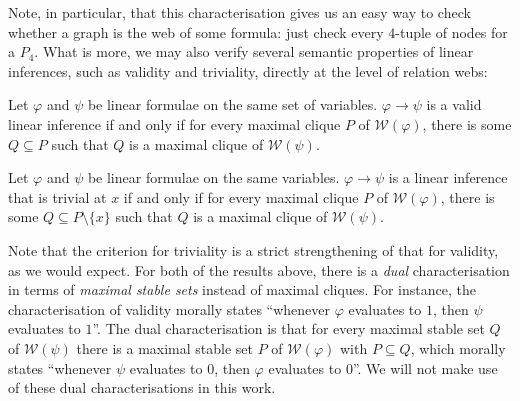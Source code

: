 \documentclass[a4paper, UKenglish, cleveref]{lipics-v2021}
\renewcommand{\phi}{\varphi}
\newcommand{\W}{\ensuremath{\mathcal{W}}}
\begin{document}
Note, in particular, that this characterisation gives us an easy way to check whether a graph is the web of some formula: just check every $4$-tuple of nodes for a $P_4$.
What is more, we may also verify several semantic properties of linear inferences, such as validity and triviality, directly at the level of relation webs:

%

%

\begin{proposition}
  \label{lem:rw-inference}
  Let $\phi$ and $\psi$ be linear formulae on the same set of variables.
   \(\phi \to \psi\) is a valid linear inference if and only if for every maximal clique \(P\) of \(\W(\phi)\), there is some \(Q \subseteq P\) such that \(Q\) is a maximal clique of \(\W(\psi)\).
\end{proposition}

%

\begin{proposition}
  \label{lem:rw-trivial}
  Let $\phi$ and $\psi$ be linear formulae on the same variables.
   \(\phi \to \psi\) is a linear inference that is trivial at \(x\) if and only if for every maximal clique \(P\) of \(\W(\phi)\), there is some \(Q \subseteq P \setminus \{x\}\) such that \(Q\) is a maximal clique of \(\W(\psi)\).
\end{proposition}
\noindent
Note that the criterion for triviality is a strict strengthening of that for validity, as we would expect.
For both of the results above, there is a \emph{dual} characterisation in terms of \emph{maximal stable sets} instead of maximal cliques.
For instance, the characterisation of validity morally states ``whenever $\phi$ evaluates to $1$, then $\psi$ evaluates to $1$''.
The dual characterisation is that for every maximal stable set $Q$ of $\W(\psi)$ there is a maximal stable set $P$ of $\W(\phi)$ with $P\subseteq Q$, which morally states ``whenever $\psi$ evaluates to $0$, then $\phi$ evaluates to $0$''.
We will not make use of these dual characterisations in this work.
\end{document}
